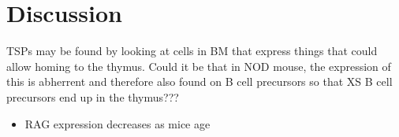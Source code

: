 
\chapter{Discussion}

TSPs may be found by looking at cells in BM that express things that could allow homing to the thymus. Could it be that in NOD mouse, the expression of this is abherrent and therefore also found on B cell precursors so that XS B cell precursors end up in the thymus???

\begin{itemize}

\item RAG expression decreases as mice age

\end{itemize}




